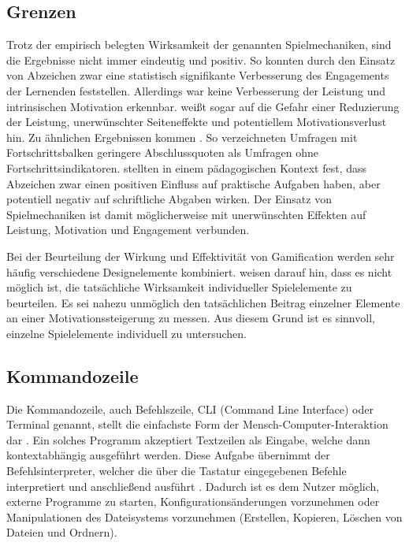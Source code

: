 \subsection{Grenzen}
Trotz der empirisch belegten Wirksamkeit der genannten Spielmechaniken, sind die Ergebnisse nicht immer eindeutig und positiv.
So konnten \citeauthor{ortiz_gamification_2017} durch den Einsatz von Abzeichen zwar eine statistisch signifikante Verbesserung des Engagements der Lernenden feststellen.
Allerdings war keine Verbesserung der Leistung und intrinsischen Motivation erkennbar.
\citeauthor{toda_dark_2018} weißt sogar auf die Gefahr einer Reduzierung der Leistung, unerwünschter Seiteneffekte und potentiellem Motivationsverlust hin.
Zu ähnlichen Ergebnissen kommen \citeauthor{liu_examining_2017}.
So verzeichneten Umfragen mit Fortschrittsbalken geringere Abschlussquoten als Umfragen ohne Fortschrittsindikatoren. \citeauthor{dominguez_gamifying_2013} stellten in einem pädagogischen Kontext fest, dass Abzeichen zwar einen positiven Einfluss auf praktische Aufgaben haben, aber potentiell negativ auf schriftliche Abgaben wirken. Der Einsatz von Spielmechaniken ist damit möglicherweise mit unerwünschten Effekten auf Leistung, Motivation und Engagement verbunden.

Bei der Beurteilung der Wirkung und Effektivität von Gamification werden sehr häufig verschiedene Designelemente kombiniert. \citeauthor{mazarakis2018gamification} weisen darauf hin, dass es nicht möglich ist, die tatsächliche Wirksamkeit individueller Spielelemente zu beurteilen. Es sei nahezu unmöglich den tatsächlichen Beitrag einzelner Elemente an einer Motivationssteigerung zu messen. Aus diesem Grund ist es sinnvoll, einzelne Spielelemente individuell zu untersuchen.


\subsection{Kommandozeile}
Die Kommandozeile, auch Befehlszeile, CLI (Command Line Interface) oder Terminal genannt, stellt die einfachste Form der Mensch-Computer-Interaktion dar \cite{Kumar2005}. Ein solches Programm akzeptiert Textzeilen als Eingabe, welche dann kontextabhängig ausgeführt werden. Diese Aufgabe übernimmt der Befehlsinterpreter, welcher die über die Tastatur eingegebenen Befehle interpretiert und anschließend ausführt \cite{wissen_interpreter}. 
Dadurch ist es dem Nutzer möglich, externe Programme zu starten, Konfigurationsänderungen vorzunehmen oder Manipulationen des Dateisystems vorzunehmen (Erstellen, Kopieren, Löschen von Dateien und Ordnern).

